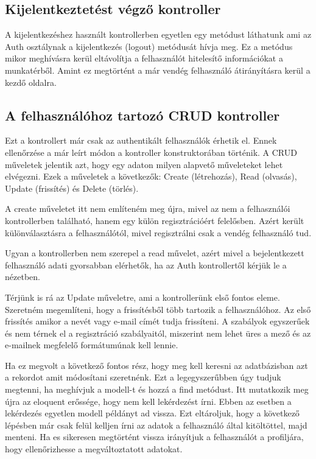\documentclass[
]{thesis-ekf}
\theoremstyle{definition}
\theoremstyle{remark}
\begin{document}
\subsection{Kijelentkeztetést végző kontroller} 
A kijelentkezéshez használt kontrollerben egyetlen egy metódust láthatunk ami az Auth osztálynak a kijelentkezés (logout) metódusát hívja meg. Ez a metódus mikor meghívásra kerül eltávolítja a felhasználót hitelesítő információkat a munkatérből. Amint ez megtörtént a már vendég felhasználó átirányításra kerül a kezdő oldalra.

\subsection{A felhasználóhoz tartozó CRUD kontroller}
Ezt a kontrollert már csak az authentikált felhasználók érhetik el. Ennek ellenőrzése a már leírt módon a kontroller konstruktorában történik. A CRUD műveletek jelentik azt, hogy egy adaton milyen alapvető műveleteket lehet elvégezni. Ezek a műveletek a következők: Create (létrehozás), Read (olvasás), Update (frissítés) és Delete (törlés). 

A create műveletet itt nem említeném meg újra, mivel az nem a felhasználói kontrollerben található, hanem egy külön regisztrációért felelősben. Azért került különválasztásra a felhasználótól, mivel regisztrálni csak a vendég felhasználó tud. 

Ugyan a kontrollerben nem szerepel a read művelet, azért mivel a bejelentkezett felhasználó adati gyorsabban elérhetők, ha az Auth kontrollertől kérjük le a nézetben.

Térjünk is rá az Update műveletre, ami a kontrollerünk első fontos eleme. Szeretném megemlíteni, hogy a frissítésből több tartozik a felhasználóhoz. Az első frissítés amikor a nevét vagy e-mail címét tudja frissíteni. A szabályok egyszerűek és nem térnek el a regisztráció szabályaitól, miszerint nem lehet üres a mező és az e-mailnek megfelelő formátumúnak kell lennie.

Ha ez megvolt a következő fontos rész, hogy meg kell keresni az adatbázisban azt a rekordot amit módosítani szeretnénk. Ezt a legegyszerűbben úgy tudjuk megtenni, ha meghívjuk a modell-t és hozzá a find metódust. Itt mutatkozik meg újra az eloquent erőssége, hogy nem kell lekérdezést írni. Ebben az esetben a lekérdezés egyetlen modell példányt ad vissza. Ezt eltároljuk, hogy a következő lépésben már csak felül kelljen írni az adatok a felhasználó által kitöltöttel, majd menteni. Ha es sikeresen megtörtént vissza irányítjuk a felhasználót a profiljára, hogy ellenőrizhesse a megváltoztatott adatokat. 
\end{document}
